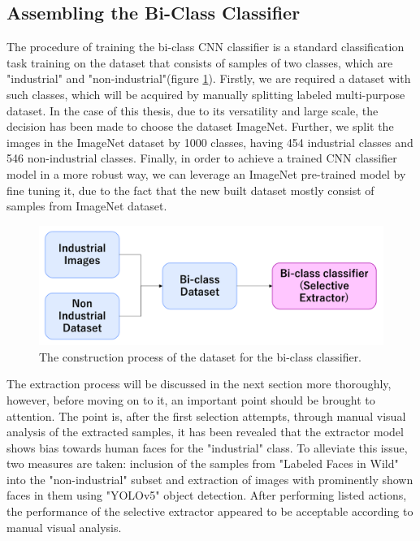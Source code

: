 \subsection{Assembling the Bi-Class Classifier}
\label{bi-class assemble}
The procedure of training the bi-class CNN classifier is a standard classification task training\cite{lenet} on the dataset that consists of samples of two classes, which are "industrial" and "non-industrial"(figure \ref{fig:cnn_train_data}). Firstly, we are required a dataset with such classes, which will be acquired by manually splitting labeled multi-purpose dataset. In the case of this thesis, due to its versatility and large scale, the decision has been made to choose the dataset ImageNet\cite{imagenet}. Further, we split the images in the ImageNet dataset by 1000 classes, having 454 industrial classes and 546 non-industrial classes. Finally, in order to achieve a trained CNN classifier model in a more robust way, we can leverage an ImageNet pre-trained model by fine tuning it, due to the fact that the new built dataset mostly consist of samples from ImageNet dataset.

\begin{figure}[t]
	\begin{center}
		\includegraphics[width=1.0\linewidth]{Chapter_3/cnn_train_data.png}
	\end{center}
	\caption{The construction process of the dataset for the bi-class classifier.}
	\label{fig:cnn_train_data}
\end{figure} 	

The extraction process will be discussed in the next section more thoroughly, however, before moving on to it, an important point should be brought to attention. The point is, after the first selection attempts, through manual visual analysis of the extracted samples, it has been revealed that the extractor model shows bias towards human faces for the "industrial" class. To alleviate this issue, two measures are taken: inclusion of the samples from "Labeled Faces in Wild"\cite{lfw} into the "non-industrial" subset and extraction of images with prominently shown faces in them using "YOLOv5"\cite{yolo} object detection. After performing listed actions, the performance of the selective extractor appeared to be acceptable according to manual visual analysis.

